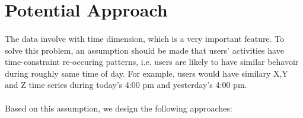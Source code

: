 \documentclass{article}
\begin{document}
	

	\section{Potential Approach} %
	\label{sec:potential_approach}
	\paragraph{}The data involve with time dimension, which is a very important feature. To solve this problem, an assumption should be made that users' activities have time-constraint re-occuring patterns, i.e. users are likely to have similar behavoir during roughly same time of day. For example, users would have similary X,Y and Z time series during today's 4:00 pm and yesterday's 4:00 pm. 
	\paragraph{} Based on this assumption, we design the following approaches:
\end{document}
